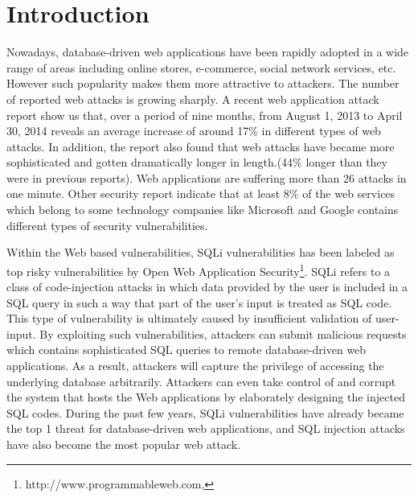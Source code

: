 \documentclass{sig-alternate}
\begin{document}
\section{Introduction}
Nowadays, database-driven web applications have been rapidly adopted in a wide range of areas including online stores, e-commerce, social network services, etc. However such popularity makes them more attractive to attackers. The number of reported web attacks is growing sharply\cite{web_security:report}. A recent web application attack report show us that, over a period of nine months, from August 1, 2013 to April 30, 2014 reveals an average increase of around 17\% in different types of web attacks. In addition, the report also found that web attacks have became more sophisticated and gotten dramatically longer in length.(44\% longer than they were in previous reports). Web applications are suffering more than 26 attacks in one minute\cite{web_security:report2}. Other security report indicate that at least 8\% of the web services which belong to some technology companies like Microsoft and Google contains different types of security vulnerabilities\cite{dsn09:scanner}.

Within the Web based vulnerabilities, SQLi vulnerabilities has been labeled as top risky vulnerabilities by {Open Web Application Security\footnote{http://www.programmableweb.com,}}. SQLi refers to a class of code-injection attacks in which data provided by the user is included in a SQL query in such a way that part of the user's input is treated as SQL code\cite{ase05:amneisa}. This type of vulnerability is ultimately caused by insufficient validation of user-input\cite{ase05:amneisa, halfond07:detection, halfond06:classification}. By exploiting such vulnerabilities, attackers can submit malicious requests which contains sophisticated SQL queries to remote database-driven web applications. As a result, attackers will capture the privilege of accessing the underlying database arbitrarily. Attackers can even take control of and corrupt the system that hosts the Web applications by elaborately designing the injected SQL codes. During the past few years, SQLi vulnerabilities have already became the top 1 threat for database-driven web applications, and SQL injection attacks have also become the most popular web attack. 
\end{document}
